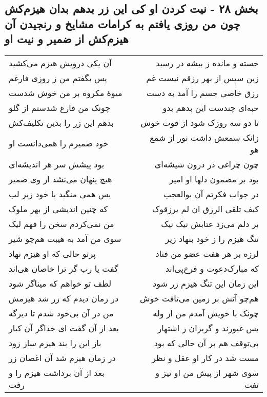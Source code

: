 \begin{center}
\section*{بخش ۲۸ - نیت کردن او کی این زر بدهم بدان  هیزم‌کش چون من روزی یافتم به کرامات مشایخ و رنجیدن آن هیزم‌کش از ضمیر و نیت او}
\label{sec:sh028}
\begin{longtable}{l p{0.5cm} r}
آن یکی درویش هیزم می‌کشید
&&
خسته و مانده ز بیشه در رسید
\\
پس بگفتم من ز روزی فارغم
&&
زین سپس از بهر رزقم نیست غم
\\
میوهٔ مکروه بر من خوش شدست
&&
رزق خاصی جسم را آمد به دست
\\
چونک من فارغ شدستم از گلو
&&
حبه‌ای چندست این بدهم بدو
\\
بدهم این زر را بدین تکلیف‌کش
&&
تا دو سه روزک شود از قوت خوش
\\
خود ضمیرم را همی‌دانست او
&&
زانک سمعش داشت نور از شمع هو
\\
بود پیشش سر هر اندیشه‌ای
&&
چون چراغی در درون شیشه‌ای
\\
هیچ پنهان می‌نشد از وی ضمیر
&&
بود بر مضمون دلها او امیر
\\
پس همی منگید با خود زیر لب
&&
در جواب فکرتم آن بوالعجب
\\
که چنین اندیشی از بهر ملوک
&&
کیف تلقی الرزق ان لم یرزقوک
\\
من نمی‌کردم سخن را فهم لیک
&&
بر دلم می‌زد عتابش نیک نیک
\\
سوی من آمد به هیبت هم‌چو شیر
&&
تنگ هیزم را ز خود بنهاد زیر
\\
پرتو حالی که او هیزم نهاد
&&
لرزه بر هر هفت عضو من فتاد
\\
گفت یا رب گر ترا خاصان هی‌اند
&&
که مبارک‌دعوت و فرخ‌پی‌اند
\\
لطف تو خواهم که میناگر شود
&&
این زمان این تنگ هیزم زر شود
\\
در زمان دیدم که زر شد هیزمش
&&
هم‌چو آتش بر زمین می‌تافت خوش
\\
من در آن بی‌خود شدم تا دیرگه
&&
چونک با خویش آمدم من از وله
\\
بعد از آن گفت ای خداگر آن کبار
&&
بس غیورند و گریزان ز اشتهار
\\
باز این را بند هیزم ساز زود
&&
بی‌توقف هم بر آن حالی که بود
\\
در زمان هیزم شد آن اغصان زر
&&
مست شد در کار او عقل و نظر
\\
بعد از آن برداشت هیزم را و رفت
&&
سوی شهر از پیش من او تیز و تفت
\\

\end{longtable}
\end{center}
